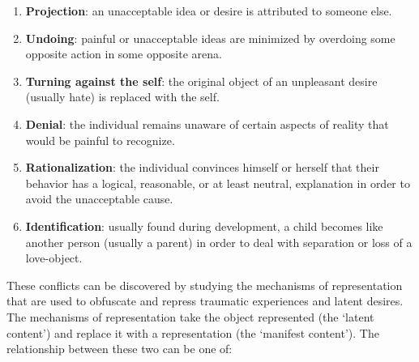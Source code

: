 \begin{enumerate}
\item \textbf{Projection}: an unacceptable idea or desire is attributed to someone else.

\item \textbf{Undoing}: painful or unacceptable ideas are minimized by overdoing some opposite action in some opposite arena.

\item \textbf{Turning against the self}: the original object of an unpleasant desire (usually hate) is replaced with the self.

\item \textbf{Denial}: the individual remains unaware of certain aspects of reality that would be painful to recognize.

\item \textbf{Rationalization}: the individual convinces himself or herself that their behavior has a logical, reasonable, or at least neutral, explanation in order to avoid the unacceptable cause.

\item \textbf{Identification}: usually found during development, a child becomes like another person (usually a parent) in order to deal with separation or loss of a love-object.

\end{enumerate}

These conflicts can be discovered by studying the mechanisms of representation that are used to obfuscate and repress traumatic experiences and latent desires. The mechanisms of representation take the object represented (the `latent content') and replace it with a representation (the `manifest content'). The relationship between these two can be one of:


